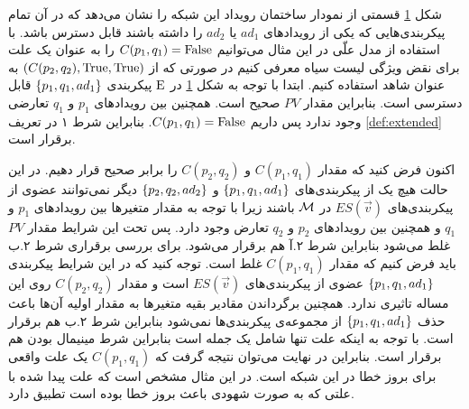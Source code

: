 \begin{figure}
    \centering
    \caption{}
    \label{fig:blacklist:es}
\end{figure}

شکل
\ref{fig:blacklist:es}
قسمتی از نمودار ساختمان رویداد این شبکه را نشان می‌دهد که در آن تمام پیکر‌بندی‌هایی که یکی از رویداد‌های 
$ad_1$
یا
$ad_2$
را داشته باشند
قابل دسترس باشد.
با استفاده از مدل علّی در این مثال می‌توانیم
$C(p_1,q_1) = \mathrm{False}$
را به عنوان یک علت برای نقض ویژگی لیست سیاه معرفی کنیم در صورتی که از
$(C(p_2,q_2),\mathrm{True},\mathrm{True})$
به عنوان شاهد استفاده کنیم.
ابتدا با توجه به شکل
\ref{fig:blacklist:es}
در 
$\mathrm{E}$
پیکربندی 
$\{p_1,q_1,ad_1\}$
قابل دسترسی است.
بنابراین مقدار
$PV$
صحیح است.
همچنین بین رویداد‌های 
$p_1$
و
$q_1$
تعارضی وجود ندارد پس داریم
$C(p_1,q_1) = \mathrm{False}$.
بنابراین شرط ۱ در تعریف 
\ref{def:extended}
برقرار است.

اکنون فرض کنید که مقدار
$C(p_1,q_1)$
و
$C(p_2,q_2)$
را برابر صحیح قرار دهیم.
در این حالت هیچ یک از پیکر‌بندی‌های 
$\{p_1,q_1,ad_1\}$
و
$\{p_2,q_2,ad_2\}$
دیگر نمی‌توانند عضوی از پیکربندی‌های 
$ES(\vec v)$
در 
$\mathcal{M}$
باشند زیرا با توجه به مقدار متغیر‌ها
بین روید‌اد‌های 
$p_1$
و
$q_1$
و همچنین بین رویداد‌های 
$p_2$
و
$q_2$
تعارض وجود دارد.
پس تحت این شرایط مقدار
$PV$
غلط می‌شود بنابراین شرط 
۲.آ هم برقرار می‌شود.
برای بررسی برقراری شرط ۲.ب
باید فرض کنیم که مقدار
$C(p_1,q_1)$
غلط است.
توجه کنید که در این شرایط پیکربندی
$\{p_1,q_1,ad_1\}$
عضوی از پیکربندی‌های 
$ES(\vec v)$
است و مقدار
$C(p_2,q_2)$
روی این مساله تاثیری ندارد.
همچنین برگرداندن مقادیر بقیه متغیر‌ها به مقدار اولیه آن‌ها باعث حذف 
$\{p_1,q_1,ad_1\}$
از مجموعه‌ی پیکربندی‌ها نمی‌شود بنابراین شرط ۲.ب هم برقرار است.
با توجه به اینکه علت تنها شامل یک جمله است بنابراین شرط مینیمال بودن هم برقرار است.
بنابراین در نهایت می‌توان نتیجه گرفت که 
$C(p_1,q_1)$
یک علت واقعی برای بروز خطا در این شبکه است.
در این مثال مشخص است که علت پیدا شده با علتی که به صورت شهودی باعث بروز خطا بوده است تطبیق دارد.

